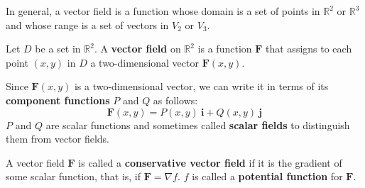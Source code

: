 \documentclass[../main.tex]{subfiles}
\begin{document}
In general, a vector field is a function whose domain is a set of points in $\mathbb{R}^2$ or $\mathbb{R}^3$ and whose range is a set of vectors in $V_2$ or $V_3$.

\begin{definition}\label{def: VectorField}
Let $D$ be a set in $\mathbb{R}^2$. A \textbf{vector field} on $\mathbb{R}^2$ is a function $\textbf{F}$ that assigns to each point $(x,y)$ in $D$ a two-dimensional vector $\textbf{F}(x,y)$.
\end{definition}

\vspace{1em}
Since $\textbf{F}(x,y)$ is a two-dimensional vector, we can write it in terms of its \textbf{component functions} $P$ and $Q$ as follows:
\begin{equation*}
	\textbf{F}(x,y) = P(x,y)\ \textbf{i} + Q(x,y)\ \textbf{j}
\end{equation*}
$P$ and $Q$ are scalar functions and sometimes called \textbf{scalar fields} to distinguish them from vector fields.

\begin{definition}\label{def:ConservativeVectorField}
A vector field $\textbf{F}$ is called a \textbf{conservative vector field} if it is the gradient of some scalar function, that is, if $\textbf{F} = \nabla f$. $f$ is called a \textbf{potential function} for $\textbf{F}$.
\end{definition}
\end{document}
